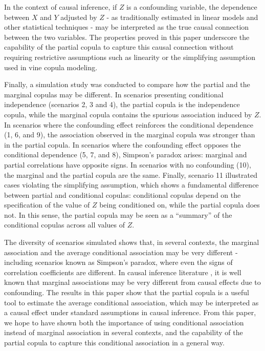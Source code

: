 \documentclass[
]{article}
\begin{document}
In the context of causal inference, if \(Z\) is a confounding variable,
the dependence between \(X\) and \(Y\) adjusted by \(Z\) - as
traditionally estimated in linear models and other statistical
techniques - may be interpreted as the true causal connection between
the two variables. The properties proved in this paper underscore the
capability of the partial copula to capture this causal connection
without requiring restrictive assumptions such as linearity or the
simplifying assumption used in vine copula modeling.

Finally, a simulation study was conducted to compare how the partial and
the marginal copulas may be different. In scenarios presenting
conditional independence (scenarios 2, 3 and 4), the partial copula is
the independence copula, while the marginal copula contains the spurious
association induced by \(Z\). In scenarios where the confounding effect
reinforces the conditional dependence (1, 6, and 9), the association
observed in the marginal copula was stronger than in the partial copula.
In scenarios where the confounding effect opposes the conditional
dependence (5, 7, and 8), Simpson's paradox arises: marginal and partial
correlations have opposite signs. In scenarios with no confounding (10),
the marginal and the partial copula are the same. Finally, scenario 11
illustrated cases violating the simplifying assumption, which shows a
fundamental difference between partial and conditional copulas:
conditional copulas depend on the specification of the value of \(Z\)
being conditioned on, while the partial copula does not. In this sense,
the partial copula may be seen as a ``summary'' of the conditional
copulas across all values of \(Z\).

The diversity of scenarios simulated shows that, in several contexts,
the marginal association and the average conditional association may be
very different - including scenarios known as Simpson's paradox, where
even the signs of correlation coefficients are different. In causal
inference literature \citep{pearl2009, pearl2016}, it is well known that
marginal associations may be very different from causal effects due to
confounding. The results in this paper show that the partial copula is a
useful tool to estimate the average conditional association, which may
be interpreted as a causal effect under standard assumptions in causal
inference. From this paper, we hope to have shown both the importance of
using conditional association instead of marginal association in several
contexts, and the capability of the partial copula to capture this
conditional association in a general way.
\end{document}

